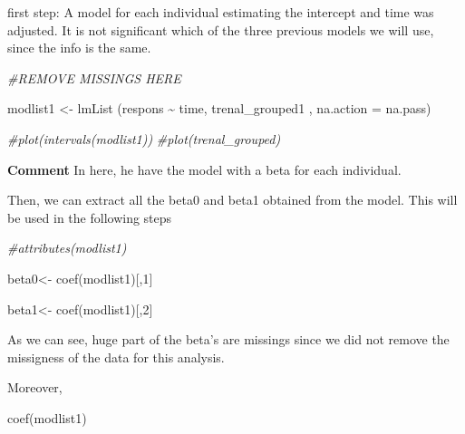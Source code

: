 \documentclass[
]{article}
\newenvironment{Shaded}{\begin{snugshade}}{\end{snugshade}}
\newcommand{\AttributeTok}[1]{\textcolor[rgb]{0.77,0.63,0.00}{#1}}
\newcommand{\CommentTok}[1]{\textcolor[rgb]{0.56,0.35,0.01}{\textit{#1}}}
\newcommand{\DecValTok}[1]{\textcolor[rgb]{0.00,0.00,0.81}{#1}}
\newcommand{\FunctionTok}[1]{\textcolor[rgb]{0.00,0.00,0.00}{#1}}
\newcommand{\NormalTok}[1]{#1}
\newcommand{\OtherTok}[1]{\textcolor[rgb]{0.56,0.35,0.01}{#1}}
\newcommand{\SpecialCharTok}[1]{\textcolor[rgb]{0.00,0.00,0.00}{#1}}
\begin{document}
first step: A model for each individual estimating the intercept and
time was adjusted. It is not significant which of the three previous
models we will use, since the info is the same.

\begin{Shaded}
\begin{Highlighting}[]
\CommentTok{\#REMOVE MISSINGS HERE}

\NormalTok{modlist1 }\OtherTok{\textless{}{-}} \FunctionTok{lmList}\NormalTok{ (respons }\SpecialCharTok{\textasciitilde{}}\NormalTok{ time, trenal\_grouped1 , }\AttributeTok{na.action =}\NormalTok{ na.pass)}


\CommentTok{\#plot(intervals(modlist1))}
\CommentTok{\#plot(trenal\_grouped)}
\end{Highlighting}
\end{Shaded}

\textbf{Comment} In here, he have the model with a beta for each
individual.

Then, we can extract all the beta0 and beta1 obtained from the model.
This will be used in the following steps

\begin{Shaded}
\begin{Highlighting}[]
\CommentTok{\#attributes(modlist1)}


\NormalTok{beta0}\OtherTok{\textless{}{-}} \FunctionTok{coef}\NormalTok{(modlist1)[,}\DecValTok{1}\NormalTok{]}

\NormalTok{beta1}\OtherTok{\textless{}{-}} \FunctionTok{coef}\NormalTok{(modlist1)[,}\DecValTok{2}\NormalTok{]}
\end{Highlighting}
\end{Shaded}

As we can see, huge part of the beta's are missings since we did not
remove the missigness of the data for this analysis.

Moreover,

\begin{Shaded}
\begin{Highlighting}[]
\FunctionTok{coef}\NormalTok{(modlist1)}
\end{Highlighting}
\end{Shaded}
\end{document}
